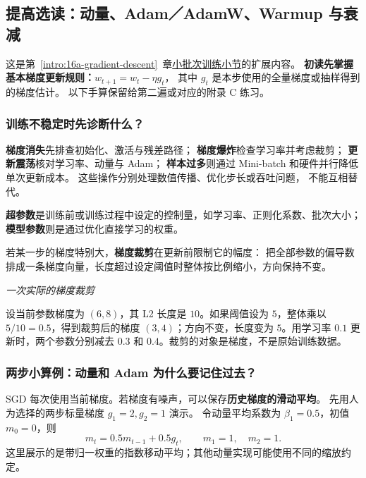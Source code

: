 \subsection{提高选读：动量、Adam／AdamW、Warmup 与衰减}
\label{app:optimizer-details}

这是第~\ref*{intro:16a-gradient-descent}~章\hyperref[intro:18c-training-engineering]{小批次训练小节}的扩展内容。
\textbf{初读先掌握基本梯度更新规则：}$w_{t+1}=w_t-\eta g_t$，
其中 $g_t$ 是本步使用的全量梯度或抽样得到的梯度估计。
以下手算保留给第二遍或对应的附录 C 练习。

\subsubsection{训练不稳定时先诊断什么？}
\label{app:training-diagnostics}


\textbf{梯度消失}先排查初始化、激活与残差路径；
\textbf{梯度爆炸}检查学习率并考虑裁剪；
\textbf{更新震荡}核对学习率、动量与 Adam；
\textbf{样本过多}则通过 Mini-batch 和硬件并行降低单次更新成本。
这些操作分别处理数值传播、优化步长或吞吐问题，
不能互相替代。

\textbf{超参数}是训练前或训练过程中设定的控制量，如学习率、正则化系数、批次大小；\textbf{模型参数}则是通过优化直接学习的权重。

若某一步的梯度特别大，\textbf{梯度裁剪}在更新前限制它的幅度：
\label{concept:gradient-clipping}把全部参数的偏导数排成一条梯度向量，长度超过设定阈值时整体按比例缩小，方向保持不变。

\begin{example}
\noindent\emph{一次实际的梯度裁剪}\par

设当前参数梯度为 $(6,8)$，其 L2 长度是 $10$。如果阈值设为 $5$，整体乘以 $5/10=0.5$，得到裁剪后的梯度 $(3,4)$；方向不变，长度变为 $5$。用学习率 $0.1$ 更新时，两个参数分别减去 $0.3$ 和 $0.4$。裁剪的对象是梯度，不是原始训练数据。
\end{example}


\subsubsection{两步小算例：动量和 Adam 为什么要记住过去？}

SGD 每次使用当前梯度。若梯度有噪声，可以保存\textbf{历史梯度的滑动平均}。
先用人为选择的两步标量梯度 $g_1=2,g_2=1$ 演示。
令动量平均系数为 $\beta_1=0.5$，初值 $m_0=0$，则
\[
m_t=0.5m_{t-1}+0.5g_t,\qquad m_1=1,\quad m_2=1.
\]
这里展示的是带归一权重的指数移动平均；其他动量实现可能使用不同的缩放约定。

